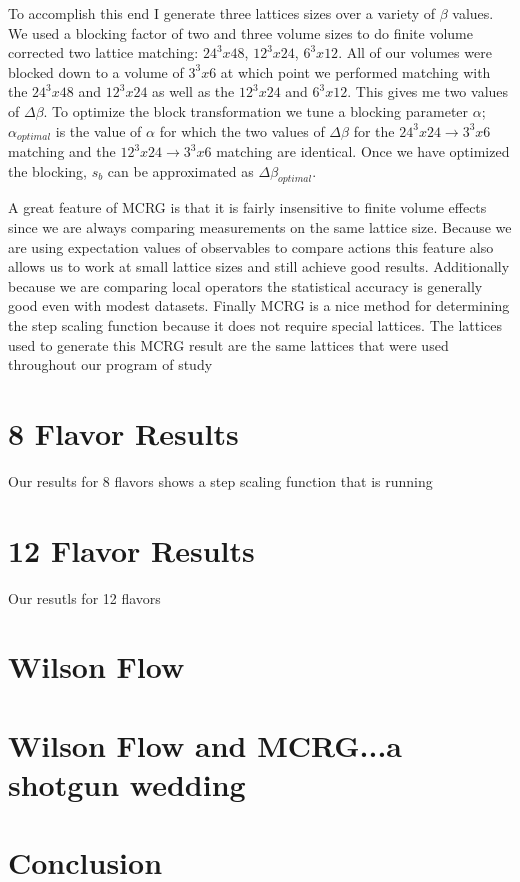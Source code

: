 \documentclass{PoS}
\begin{document}
To accomplish this end I generate three lattices sizes over a variety of $\beta$ values.
We used a blocking factor of two and three volume sizes to do finite volume corrected two lattice matching: $24^3x48$, $12^3x24$, $6^3x12$.
All of our volumes were blocked down to a volume of $3^3x6$ at which point we performed matching with the $24^3x48$ and $12^3x24$ as well as the $12^3x24$ and $6^3x12$.
This gives me two values of $\Delta\beta$.
To optimize the block transformation we tune a blocking parameter $\alpha$; $\alpha_{optimal}$ is the value of $\alpha$ for which the two values of $\Delta\beta$ for the $24^3x24\to3^3x6$ matching and the $12^3x24\to3^3x6$ matching are identical.
Once we have optimized the blocking, $s_b$ can be approximated as $\Delta\beta_{optimal}$.

A great feature of MCRG is that it is fairly insensitive to finite volume effects since we are always comparing measurements on the same lattice size.
Because we are using expectation values of observables to compare actions this feature also allows us to work at small lattice sizes and still achieve good results.
Additionally because we are comparing local operators the statistical accuracy is generally good even with modest datasets.
Finally MCRG is a nice method for determining the step scaling function because it does not require special lattices.
The lattices used to generate this MCRG result are the same lattices that were used throughout our program of study

\section{8 Flavor Results}
Our results for 8 flavors shows a step scaling function that is running 

\section{12 Flavor Results}
Our resutls for 12 flavors 

\section{Wilson Flow}

\section{Wilson Flow and MCRG...a shotgun wedding}

\section{Conclusion}
\end{document}
